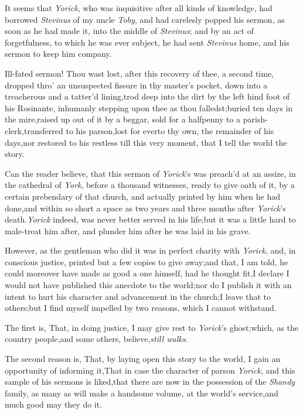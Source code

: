 \documentclass{article}
\begin{document}
It seems that \textit{Yorick}, who was inquisitive after all kinds
of knowledge, had borrowed \textit{Stevinus} of my uncle \textit{Toby},
and had carelesly popped his sermon, as soon as he had made it,
into the middle of \textit{Stevinus}; and by an act of forgetfulness,
to which he was ever subject, he had sent \textit{Stevinus} home, and
his sermon to keep him company.

Ill-fated sermon! Thou wast lost, after this recovery of thee, a
second time, dropped thro’ an unsuspected fissure in thy
master’s pocket, down into a treacherous and a tatter’d
lining,\tsk trod deep into the dirt by the left hind foot of
his Rosinante, inhumanly stepping upon thee as thou
falledst;\tsk buried ten days in the mire,\tsh raised up
out of it by a beggar, sold for a halfpenny to a
parish-clerk,\tsk\break transferred to his
parson,\tsh lost for ever\pb to thy own, the remainder of his
days,\tsk\break nor restored to his restless  till
this very moment, that I tell the world the story.

Can the reader believe, that this sermon of
\textit{Yorick}’s was preach’d at an assize, in the cathedral
of \textit{York}, before a thousand witnesses, ready to give oath of
it, by a certain prebendary of that church, and actually printed by
him when he had done,\tsh and within so short a space as
two years and three months after \textit{Yorick}’s
death.\tsk \textit{Yorick} indeed, was never better served in his
life;\tsh but it was a little hard to male-treat him after,
and plunder him after he was laid in his grave.

However, as the gentleman who did it was in perfect charity with
\textit{Yorick},\tsk\break
and, in conscious justice, printed but a\pb
few copies to give away;\tsk and that, I am told, he could
moreover have made as good a one himself, had he thought
fit,\break \tsk I declare I would not have published this
anecdote to the world;\tsk nor do I publish it with an intent to
hurt his character and advancement in the church;\tsk\break I
leave that to others;\tsh but I find myself impelled by two
reasons, which I cannot withstand.

The first is, That, in doing justice, I may give rest to
\textit{Yorick}’s ghost;\tsh which, as the
country people,\tsk and some others, believe,\tsh \textit{still
walks}.

The second reason is, That, by laying open this story to the
world, I gain an opportunity of informing it,\tsk That in case
the character of parson \textit{Yorick}, and this sample of his
sermons is liked,\tsh that\pb
there are now in the possession of
the \textit{Shandy} family, as many as will make a handsome volume,
at the world’s service,\tsh and much good may they\break
do it.
\end{document}
